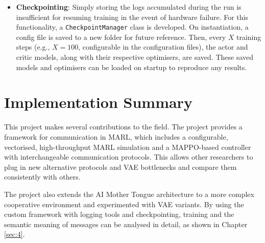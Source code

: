 \begin{itemize}
\item \textbf{Checkpointing}:
Simply storing the logs accumulated during the run is insufficient for resuming training in the event of hardware failure.
For this functionality, a \lstinline[language=Python]|CheckpointManager| class is developed.
On instantiation, a config file is saved to a new folder for future reference.
Then, every $X$ training steps (e.g., $X=100$, configurable in the configuration files), the actor and critic models, along with their respective optimisers, are saved.
These saved models and optimisers can be loaded on startup to reproduce any results.
\end{itemize}

\section{Implementation Summary}
\label{sec:3.9}

This project makes several contributions to the field.
The project provides a framework for communication in MARL, which includes a configurable, vectorised, high-throughput MARL simulation and a MAPPO-based controller with interchangeable communication protocols.
This allows other researchers to plug in new alternative protocols and VAE bottlenecks and compare them consistently with others.

The project also extends the AI Mother Tongue architecture \cite{AIMotherTongue} to a more complex cooperative environment and experimented with VAE variants.
By using the custom framework with logging tools and checkpointing, training and the semantic meaning of messages can be analysed in detail, as shown in Chapter \ref{sec:4}.




